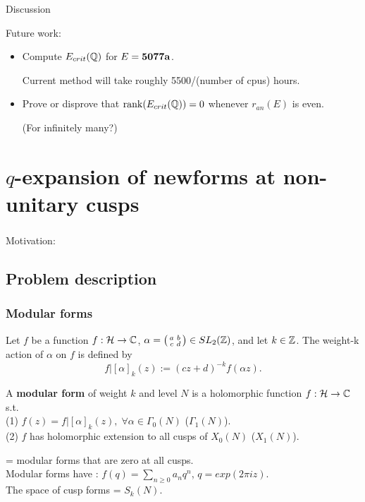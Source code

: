 \documentclass[handout]{beamer}
\begin{document}
\begin{frame}{Discussion}

\pause
\smallskip
Future work: 
\begin{itemize}
\item Compute $E_{crit}(\mathbb{Q})$ for $E = {\bf 5077a}$. 

Current method will take roughly  5500/(number of cpus) hours.  

\item Prove or disprove that $\rank(E_{crit}(\mathbb{Q})) = 0$ whenever $r_{an}(E)$ is even.

(For infinitely many?) 

\end{itemize}

\end{frame}







\section{$q$-expansion of newforms at non-unitary cusps} 

 \begin{frame}
 \frametitle{\insertsection}
Motivation: 

\end{frame}


\subsection{Problem description}



\begin{frame}
\frametitle{Modular forms}
Let $f$ be a function $f: \mathcal{H} \to \mathbb{C}$,  $\alpha  = \left( \begin{smallmatrix}a&b\\c&d\end{smallmatrix}\right) \in SL_2(\mathbb{Z})$, and let $k \in \mathbb{Z}$. The weight-k action of $\alpha$ on $f$ is
defined by
\[
	f|[\alpha]_k(z) := (cz+d)^{-k}f(\alpha z).
\]

\pause

\begin{Def}
A \textbf{modular form} of weight $k$ and level $N$ is a holomorphic function $f: \mathcal{H} \to \mathbb{C}$ s.t. \\
(1) $f(z)  = f|[\alpha]_k(z), \; \forall \alpha \in \Gamma_0(N)$ ($\Gamma_1(N)$). \\
(2) $f$ has holomorphic extension to all cusps of $X_0(N)$ ($X_1(N)$). \\
\end{Def}

\pause

 = modular forms that are zero at all cusps. \\
Modular forms have : $f(q) = \sum_{n \geq 0} a_n q^n$, $q = exp(2\pi i z)$. \\
The space of cusp forms = $S_k(N)$. 

\end{frame}
\end{document}
